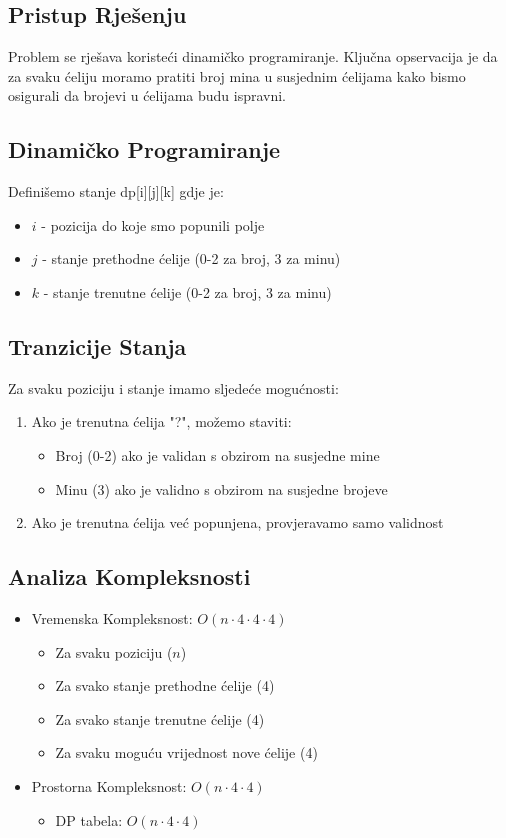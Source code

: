 \subsection{Pristup Rješenju}
Problem se rješava koristeći dinamičko programiranje. Ključna opservacija je da za svaku ćeliju moramo pratiti broj mina u susjednim ćelijama kako bismo osigurali da brojevi u ćelijama budu ispravni.

\subsection{Dinamičko Programiranje}
Definišemo stanje dp[i][j][k] gdje je:
\begin{itemize}
    \item $i$ - pozicija do koje smo popunili polje
    \item $j$ - stanje prethodne ćelije (0-2 za broj, 3 za minu)
    \item $k$ - stanje trenutne ćelije (0-2 za broj, 3 za minu)
\end{itemize}

\subsection{Tranzicije Stanja}
Za svaku poziciju i stanje imamo sljedeće mogućnosti:
\begin{enumerate}
    \item Ako je trenutna ćelija "?", možemo staviti:
        \begin{itemize}
            \item Broj (0-2) ako je validan s obzirom na susjedne mine
            \item Minu (3) ako je validno s obzirom na susjedne brojeve
        \end{itemize}
    \item Ako je trenutna ćelija već popunjena, provjeravamo samo validnost
\end{enumerate}

\subsection{Analiza Kompleksnosti}
\begin{itemize}
    \item Vremenska Kompleksnost: $O(n \cdot 4 \cdot 4 \cdot 4)$
        \begin{itemize}
            \item Za svaku poziciju ($n$)
            \item Za svako stanje prethodne ćelije (4)
            \item Za svako stanje trenutne ćelije (4)
            \item Za svaku moguću vrijednost nove ćelije (4)
        \end{itemize}
    \item Prostorna Kompleksnost: $O(n \cdot 4 \cdot 4)$
        \begin{itemize}
            \item DP tabela: $O(n \cdot 4 \cdot 4)$
        \end{itemize}
\end{itemize}

